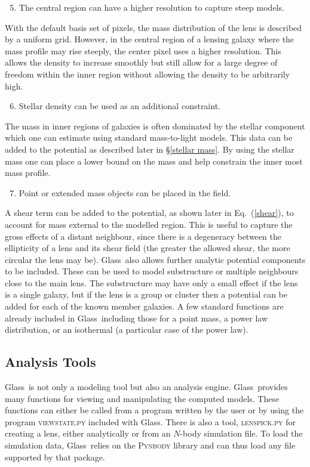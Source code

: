 \documentclass[galley,usenatbib]{mn2e}
\newcommand{\Glass}{{\sc Glass}}
\newcommand{\eqnref}[1] {Eq.~(\ref{#1})}
\newcommand{\secref}[1] {\S\ref{#1}}
\begin{document}
%
\begin{enumerate}
  \setcounter{enumi}{4}
  \item The central region can have a higher resolution to capture steep models. 
\end{enumerate}
%
With the default basis set of pixels, the mass distribution of the lens is
described by a uniform grid. However, in the central region of a lensing galaxy
where the mass profile may rise steeply, the center pixel uses a higher
resolution. This allows the density to increase smoothly but still allow for a
large degree of freedom within the inner region without allowing the density to
be arbitrarily high. 
%
\begin{enumerate}
  \setcounter{enumi}{5}
  \item Stellar density can be used as an additional constraint.  
\end{enumerate}
%
The mass in inner regions of galaxies is often dominated by the stellar component
which one can estimate using standard mass-to-light models. This data can be added
to the potential as described later in \secref{stellar mass}. By using the stellar
mass one can place a lower bound on the mass and help constrain the inner most
mass profile.
%
\begin{enumerate}
  \setcounter{enumi}{6}
  \item Point or extended mass objects can be placed in the field.
\end{enumerate}
%
A shear term can be added to the potential, as shown later in \eqnref{shear},
to account for mass external to the modelled region. This is useful to capture
the gross effects of a distant neighbour, since there is a degeneracy between
the ellipticity of a lens and its shear field (the greater the allowed shear, the
more circular the lens may be). \Glass\ also allows further analytic potential
components to be included. These can be used to model substructure or multiple
neighbours close to the main lens. The substructure may have only a small
effect if the lens is a single galaxy, but if the lens is a group or cluster then a
potential can be added for each of the known member galaxies. A few standard functions are
already included in \Glass\ including those for a point mass, a power law
distribution, or an isothermal (a particular case of the power law).

\subsection{Analysis Tools}\label{sec:tools}
\Glass\ is not only a modeling tool but also an analysis engine. \Glass\
provides many functions for viewing and manipulating the computed models.
These functions can either be called from a program written by the user or by
using the program \textsc{viewstate.py} included with \Glass. There is also a
tool, \textsc{lenspick.py} for creating a lens, either analytically or from an
$N$-body simulation file. To load the simulation data, \Glass\ relies on the
\textsc{Pynbody} library \citep{pynbody} and can thus load any file supported
by that package.
\end{document}
